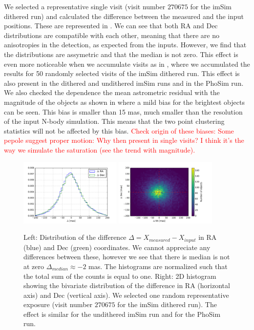 \documentclass[\docopts]{\docclass}
\begin{document}
We selected a representative single visit (visit number $270675$ for the imSim dithered run) and calculated the difference
between the measured and the input positions. These are represented in . We can see that both RA and Dec
distributions are compatible with each other, meaning that there are no anisotropies in the detection, as expected from the inputs.
However, we find that the distributions are assymetric and that the median is not zero. This effect is even more noticeable when we
accumulate visits as in , where we accumulated the results for 50 randomly selected visits of the imSim dithered
run. This effect is also present in the dithered and undithered imSim runs and in the PhoSim run. We also checked the dependence the
mean astrometric residual with the magnitude of the objects as shown in  where a mild bias for the brightest
objects can be seen. This bias is smaller than 15 mas, much smaller than the resolution of the input N-body simulation. This means
that the two point clustering statistics will not be affected by this bias.
\textcolor{red}{Check origin of these biases: Some pepole suggest proper motion: Why then
present in single visits? I think it's the way we simulate the saturation (see the trend with magnitude).}

\begin{figure}
  \centering
  \includegraphics[width=0.45\textwidth]{astrometry_single_visit_imsim_dithered_hist}
  \includegraphics[width=0.45\textwidth]{astrometry_single_visit_imsim_dithered_hist2d}
  \caption{Left: Distribution of the difference $\Delta=X_{measured}-X_{input}$ in RA (blue) and Dec (green) coordinates. We cannot
  appreciate any differences between these, however we see that there is median is not at zero $\Delta_{median} \approx -2$ mas.
  The histograms are normalized such that the total sum of the counts is equal to one. Right: 2D histogram
  showing the bivariate distribution of the difference in RA (horizontal axis) and Dec (vertical axis). We selected one random representative
  exposure (visit number $270675$ for the imSim dithered run). The effect is similar for the undithered imSim run and for the PhoSim run.}
  \label{fig:astrometry_a}
\end{figure}
\end{document}
